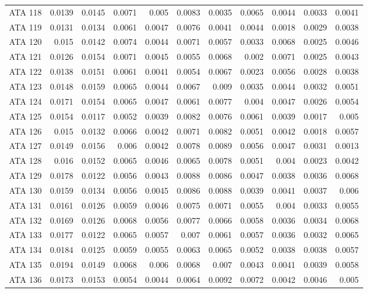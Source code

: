 \begin{landscape}
\begin{longtable}{rrrrrrrrrrr}
  ATA 118 & 0.0139 & 0.0145 & 0.0071 & 0.005 & 0.0083 & 0.0035 & 0.0065 & 0.0044 & 0.0033 & 0.0041 \\ 
  ATA 119 & 0.0131 & 0.0134 & 0.0061 & 0.0047 & 0.0076 & 0.0041 & 0.0044 & 0.0018 & 0.0029 & 0.0038 \\ 
  ATA 120 & 0.015 & 0.0142 & 0.0074 & 0.0044 & 0.0071 & 0.0057 & 0.0033 & 0.0068 & 0.0025 & 0.0046 \\ 
  ATA 121 & 0.0126 & 0.0154 & 0.0071 & 0.0045 & 0.0055 & 0.0068 & 0.002 & 0.0071 & 0.0025 & 0.0043 \\ 
  ATA 122 & 0.0138 & 0.0151 & 0.0061 & 0.0041 & 0.0054 & 0.0067 & 0.0023 & 0.0056 & 0.0028 & 0.0038 \\ 
  ATA 123 & 0.0148 & 0.0159 & 0.0065 & 0.0044 & 0.0067 & 0.009 & 0.0035 & 0.0044 & 0.0032 & 0.0051 \\ 
  ATA 124 & 0.0171 & 0.0154 & 0.0065 & 0.0047 & 0.0061 & 0.0077 & 0.004 & 0.0047 & 0.0026 & 0.0054 \\ 
  ATA 125 & 0.0154 & 0.0117 & 0.0052 & 0.0039 & 0.0082 & 0.0076 & 0.0061 & 0.0039 & 0.0017 & 0.005 \\ 
  ATA 126 & 0.015 & 0.0132 & 0.0066 & 0.0042 & 0.0071 & 0.0082 & 0.0051 & 0.0042 & 0.0018 & 0.0057 \\ 
  ATA 127 & 0.0149 & 0.0156 & 0.006 & 0.0042 & 0.0078 & 0.0089 & 0.0056 & 0.0047 & 0.0031 & 0.0013 \\ 
  ATA 128 & 0.016 & 0.0152 & 0.0065 & 0.0046 & 0.0065 & 0.0078 & 0.0051 & 0.004 & 0.0023 & 0.0042 \\ 
  ATA 129 & 0.0178 & 0.0122 & 0.0056 & 0.0043 & 0.0088 & 0.0086 & 0.0047 & 0.0038 & 0.0036 & 0.0068 \\ 
  ATA 130 & 0.0159 & 0.0134 & 0.0056 & 0.0045 & 0.0086 & 0.0088 & 0.0039 & 0.0041 & 0.0037 & 0.006 \\ 
  ATA 131 & 0.0161 & 0.0126 & 0.0059 & 0.0046 & 0.0075 & 0.0071 & 0.0055 & 0.004 & 0.0033 & 0.0055 \\ 
  ATA 132 & 0.0169 & 0.0126 & 0.0068 & 0.0056 & 0.0077 & 0.0066 & 0.0058 & 0.0036 & 0.0034 & 0.0068 \\ 
  ATA 133 & 0.0177 & 0.0122 & 0.0065 & 0.0057 & 0.007 & 0.0061 & 0.0057 & 0.0036 & 0.0032 & 0.0065 \\ 
  ATA 134 & 0.0184 & 0.0125 & 0.0059 & 0.0055 & 0.0063 & 0.0065 & 0.0052 & 0.0038 & 0.0038 & 0.0057 \\ 
  ATA 135 & 0.0194 & 0.0149 & 0.0068 & 0.006 & 0.0068 & 0.007 & 0.0043 & 0.0041 & 0.0039 & 0.0058 \\ 
  ATA 136 & 0.0173 & 0.0153 & 0.0054 & 0.0044 & 0.0064 & 0.0092 & 0.0072 & 0.0042 & 0.0046 & 0.005 \\ 

\end{longtable}
\end{landscape}
